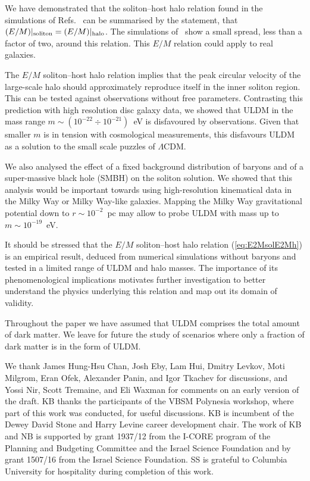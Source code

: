 \documentclass[aps,prd,floats,superscriptaddress,showpacs,nofootinbib,twocolumn,preprintnumbers]{revtex4-1}%
\begin{document}
We have demonstrated 
that the soliton--host halo relation found in the simulations of
Refs.~\cite{Schive:2014hza,Schive:2014dra} can be summarised by the
statement, that $(E/M)|_{\rm soliton}=(E/M)|_{\rm halo}$. The
simulations of~\cite{Schive:2014hza} show a small spread, less than a
factor of two, around this relation. This $E/M$ relation could apply
to real galaxies.  

The $E/M$ soliton--host halo relation implies that the peak circular
velocity of the large-scale halo should approximately reproduce itself
in the inner soliton region. This can be tested against observations
without free parameters. Contrasting this prediction with high
resolution disc galaxy data, we showed that ULDM in the mass range
$m\sim (10^{-22}\div 10^{-21})$~eV is disfavoured by observations. Given
that smaller $m$ is in tension with cosmological measurements, this disfavours ULDM
as a solution to the small scale puzzles of $\Lambda$CDM. 

We also analysed the effect 
of a fixed background distribution of baryons and of a super-massive
black hole (SMBH) on the soliton 
solution. We showed that this analysis would be important towards
using high-resolution kinematical data in the Milky Way or Milky
Way-like galaxies. Mapping the Milky Way gravitational potential down
to $r\sim 10^{-2}$~pc may allow to probe ULDM with
mass up to $m\sim10^{-19}$~eV.

It should be stressed that the $E/M$ soliton--host halo relation
(\ref{eq:E2MsolE2Mh}) is an empirical result, deduced from numerical
simulations without baryons and
tested in a limited range of ULDM and halo masses. The importance of
its phenomenological implications motivates further investigation
to better understand the physics underlying this relation 
and map out its domain of
validity. 

Throughout the paper we have assumed that ULDM comprises the total
amount of dark matter. We leave for future the study of scenarios
where only a fraction of dark matter is in the form of ULDM.




\acknowledgments
%
We thank James Hung-Hsu Chan, Josh Eby, Lam Hui, Dmitry Levkov, Moti Milgrom, Eran Ofek,
Alexander Panin, and Igor Tkachev for discussions, and Yossi Nir, Scott Tremaine, and Eli Waxman for comments on an early version of the draft. KB thanks the participants of the VBSM Polynesia workshop, where part of this work was conducted, for useful discussions. 
KB is incumbent of the Dewey David Stone
and Harry Levine career development chair. The work of KB and NB is
supported by grant 1937/12 from the I-CORE program of the Planning and
Budgeting Committee and the Israel Science Foundation and by grant
1507/16 from the Israel Science Foundation. SS is grateful to Columbia
University for hospitality during completion of this work. 
\end{document}
